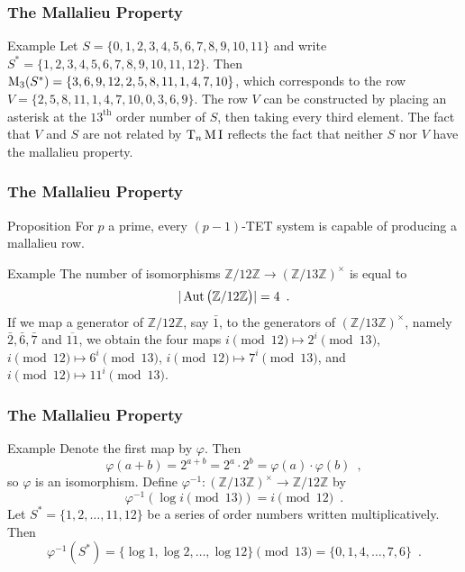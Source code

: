 \begin{frame}
	\frametitle{The Mallalieu Property}
	\begin{block}{Example}
	Let $S = \{ 0, 1, 2, 3, 4, 5, 6, 7, 8, 9, 10, 11 \}$ and write $S^* = \{ 1, 2, 3, 4, 5, 6, 7, 8, 9, 10, 11, 12 \}$. Then $\operatorname{M}_3(S^*) = \{ 3, 6, 9, 12, 2, 5, 8, 11, 1, 4, 7, 10 \}$, which corresponds to the row $V = \{ 2, 5, 8, 11, 1, 4, 7, 10, 0, 3, 6, 9 \}$. The row $V$ can be constructed by placing an asterisk at the $13^\text{th}$ order number of $S$, then taking every third element. The fact that $V$ and $S$ are not related by $\operatorname{T}_n\operatorname{M}\operatorname{I}$ reflects the fact that neither $S$ nor $V$ have the mallalieu property.
	\end{block}
\end{frame}

\begin{frame}
	\frametitle{The Mallalieu Property}
	\begin{block}{Proposition}
	For $p$ a prime, every $(p - 1)$-TET system is capable of producing a mallalieu row.
	\end{block}
	\begin{block}{Example}
	The number of isomorphisms $\mathbb{Z} / 12 \mathbb{Z} \to (\mathbb{Z} / 13 \mathbb{Z})^\times$ is equal to
	\begin{equation*}
		|\operatorname{Aut}\big(\mathbb{Z} / 12 \mathbb{Z}\big)| = 4 \enspace.
	\end{equation*}
	If we map a generator of $\mathbb{Z} / 12 \mathbb{Z}$, say $\bar{1}$, to the generators of $(\mathbb{Z} / 13 \mathbb{Z})^\times$, namely $\bar{2}, \bar{6}, \bar{7}$ and $\overline{11}$, we obtain the four maps $i \pmod{12} \mapsto 2^i \pmod{13}$, $i \pmod{12} \mapsto 6^i \pmod{13}$, $i \pmod{12} \mapsto 7^i \pmod{13}$, and $i \pmod{12} \mapsto 11^i \pmod{13}$.
	\end{block}
\end{frame}

\begin{frame}
	\frametitle{The Mallalieu Property}
	\begin{block}{Example}
	Denote the first map by $\varphi$. Then
	\begin{equation*}
		\varphi(a + b) = 2^{a + b} = 2^a \cdot 2^b = \varphi(a) \cdot \varphi(b) \enspace,
	\end{equation*}
	so $\varphi$ is an isomorphism. Define $\varphi^{-1} : (\mathbb{Z} / 13 \mathbb{Z})^\times \to \mathbb{Z} / 12 \mathbb{Z}$ by
	$$\varphi^{-1}(\log i \pmod{13}) = i \pmod{12} \enspace.$$
	Let $S^* = \{ 1, 2, \dots, 11, 12 \}$ be a series of order numbers written multiplicatively. Then
	\begin{equation*}
		\varphi^{-1}(S^*) = \{ \log 1, \log 2, \dots, \log 12 \} \pmod{13} =
		\{ 0, 1, 4, \dots, 7, 6 \} \enspace.
	\end{equation*}
	\end{block}
\end{frame}
